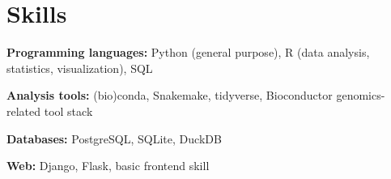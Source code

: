 \section{Skills}

\begin{multicols}{2}

\begin{entrylist}[
    topsep=2pt,
    itemsep=2pt plus 0.5pt minus 0.5pt,
]

\item \textbf{Programming languages:}
    Python (general purpose),
    R (data analysis, statistics, visualization),
    SQL

\item \textbf{Analysis tools:} (bio)conda, Snakemake, tidyverse, Bioconductor genomics-related tool stack

\item \textbf{Databases:} PostgreSQL, SQLite, DuckDB

\item \textbf{Web:} Django, Flask, basic frontend skill

\end{entrylist}
\end{multicols}
